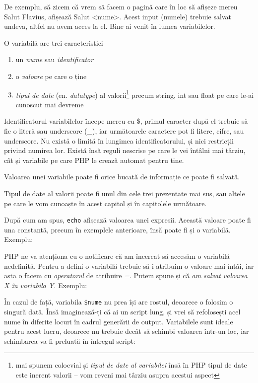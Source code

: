 De exemplu, să zicem că vrem să facem o pagină care în loc să afișeze
mereu {\glqq}Salut Flavius{\grqq}, afișează {\glqq}Salut <nume>{\grqq}. Acest input (numele) trebuie
salvat undeva, altfel nu avem acces la el. Bine ai venit în lumea variabilelor.

O variabilă are trei caracteristici
\begin{enumerate}
\item un \textsl{nume} sau \textsl{identificator}
\item o \textsl{valoare} pe care o ține
\item \textsl{tipul de date} (en. \textsl{datatype}) al valorii\footnote{mai
spunem colocvial și \textit{tipul de date al variabilei} însă în PHP tipul
de date este inerent valorii -- vom reveni mai târziu asupra acestui aspect} precum
string, int sau float pe care le-ai cunoscut mai devreme
\end{enumerate}

Identificatorul variabilelor începe mereu cu \$, primul caracter după el
trebuie să fie o literă sau underscore (\_), iar următoarele
caractere pot fi litere, cifre, sau underscore.
Nu există o limită în lungimea identificatorului, și nici restricții privind
numirea lor. Există însă reguli nescrise pe care le vei întâlni mai târziu,
cât și variabile pe care PHP le crează automat pentru tine.

Valoarea unei variabile poate fi orice bucată de informație ce poate
fi salvată.

Tipul de date al valorii poate fi unul din cele trei prezentate mai sus,
sau altele pe care le vom cunoaște în acest capitol și în capitolele următoare.

După cum am spus, \texttt{echo} afișează valoarea unei expresii.
Această valoare poate fi una constantă, precum în exemplele anterioare,
însă poate fi și o variabilă. Exemplu:

PHP ne va atenționa cu o notificare că am încercat să accesăm o variabilă
nedefinită. Pentru a defini o variabilă trebuie să-i atribuim o valoare
mai întâi, iar asta o facem cu \textsl{operatorul} de atribuire \textsl{=}.
Putem spune și că \textit{am salvat valoarea X în variabila Y}. Exemplu:



În cazul de față, variabila \texttt{\$nume} nu prea își are rostul, deoarece o
folosim o singură dată. Însă imaginează-ți că ai un script lung,
și vrei să refolosești acel nume în diferite locuri în cadrul generării de
output. Variabilele sunt ideale pentru acest lucru, deoarece nu trebuie
decât să schimbi valoarea într-un loc, iar schimbarea va fi preluată în
întregul script:


